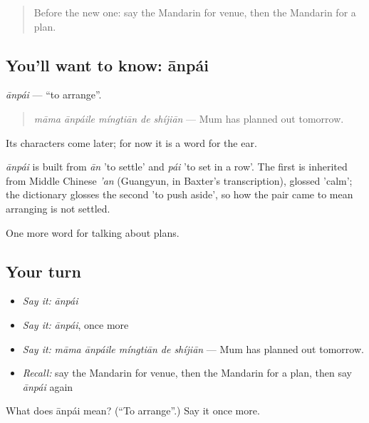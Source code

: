 \label{lesson:ZH-C207-anpai}



\begin{quote}
Before the new one: say the Mandarin for venue, then the Mandarin for a plan.
\end{quote}

\subsection*{You'll want to know: ānpái}
\emph{ānpái} — \textquotedblleft{}to arrange\textquotedblright{}.

\begin{quote}
\emph{māma ānpáile míngtiān de shíjiān} — Mum has planned out tomorrow.
\end{quote}

Its characters come later; for now it is a word for the ear.

\begin{cousinweb}
\emph{ānpái} is built from \emph{ān} 'to settle' and \emph{pái} 'to set in a row'. The first is inherited from Middle Chinese \emph{'an} (Guangyun, in Baxter's transcription), glossed 'calm'; the dictionary glosses the second 'to push aside', so how the pair came to mean arranging is not settled.
\end{cousinweb}

\begin{grammarlens}[title={What you've built}]
One more word for talking about plans.
\end{grammarlens}

\subsection*{Your turn}
\begin{itemize}
\raggedright
  \item \emph{Say it:} \emph{ānpái}
  \item \emph{Say it:} \emph{ānpái}, once more
  \item \emph{Say it:} \emph{māma ānpáile míngtiān de shíjiān} — Mum has planned out tomorrow.
  \item \emph{Recall:} say the Mandarin for venue, then the Mandarin for a plan, then say \emph{ānpái} again
\end{itemize}

\begin{tcolorbox}[breakable,colback=teal!4,colframe=teal!35!black,title={Before you move on}]
What does ānpái mean? (\textquotedblleft{}To arrange\textquotedblright{}.) Say it once more.
\end{tcolorbox}
